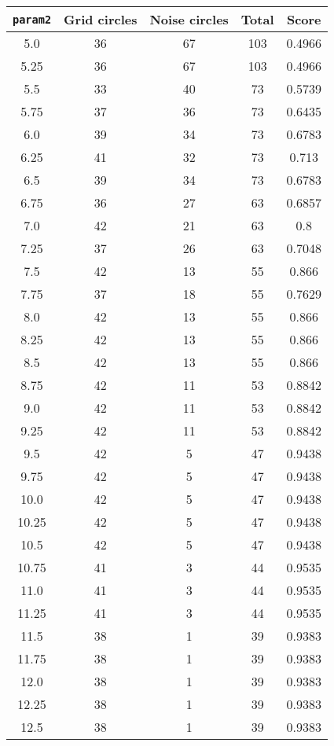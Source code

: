 \documentclass[letterpaper, 12pt]{article}
\begin{document}
\begin{longtable}{|c|c|c|c|c|}
\hline
\textbf{\texttt{param2}} & \textbf{Grid circles} & \textbf{Noise circles} & \textbf{Total} & \textbf{Score} \\
\hline
5.0 & 36 & 67 & 103 & 0.4966 \\
\hline
5.25 & 36 & 67 & 103 & 0.4966 \\
\hline
5.5 & 33 & 40 & 73 & 0.5739 \\
\hline
5.75 & 37 & 36 & 73 & 0.6435 \\
\hline
6.0 & 39 & 34 & 73 & 0.6783 \\
\hline
6.25 & 41 & 32 & 73 & 0.713 \\
\hline
6.5 & 39 & 34 & 73 & 0.6783 \\
\hline
6.75 & 36 & 27 & 63 & 0.6857 \\
\hline
7.0 & 42 & 21 & 63 & 0.8 \\
\hline
7.25 & 37 & 26 & 63 & 0.7048 \\
\hline
7.5 & 42 & 13 & 55 & 0.866 \\
\hline
7.75 & 37 & 18 & 55 & 0.7629 \\
\hline
8.0 & 42 & 13 & 55 & 0.866 \\
\hline
8.25 & 42 & 13 & 55 & 0.866 \\
\hline
8.5 & 42 & 13 & 55 & 0.866 \\
\hline
8.75 & 42 & 11 & 53 & 0.8842 \\
\hline
9.0 & 42 & 11 & 53 & 0.8842 \\
\hline
9.25 & 42 & 11 & 53 & 0.8842 \\
\hline
9.5 & 42 & 5 & 47 & 0.9438 \\
\hline
9.75 & 42 & 5 & 47 & 0.9438 \\
\hline
10.0 & 42 & 5 & 47 & 0.9438 \\
\hline
10.25 & 42 & 5 & 47 & 0.9438 \\
\hline
10.5 & 42 & 5 & 47 & 0.9438 \\
\hline
10.75 & 41 & 3 & 44 & 0.9535 \\
\hline
11.0 & 41 & 3 & 44 & 0.9535 \\
\hline
11.25 & 41 & 3 & 44 & 0.9535 \\
\hline
11.5 & 38 & 1 & 39 & 0.9383 \\
\hline
11.75 & 38 & 1 & 39 & 0.9383 \\
\hline
12.0 & 38 & 1 & 39 & 0.9383 \\
\hline
12.25 & 38 & 1 & 39 & 0.9383 \\
\hline
12.5 & 38 & 1 & 39 & 0.9383 \\

\end{longtable}
\end{document}
